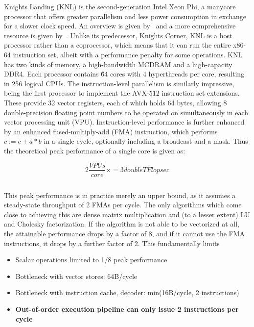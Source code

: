 Knights Landing (KNL) is the second-generation Intel Xeon Phi, a manycore processor that offers greater parallelism and less power consumption in exchange for a slower clock speed. An overview is given by~\cite{Sodani:2016:KLS:2927511.2927563} and a more comprehensive resource is given by~\cite{Jeffers:2016:IXP:3050856}. Unlike its predecessor, Knights Corner, KNL is a host processor rather than a coprocessor, which means that it can run the entire x86-64 instruction set, albeit with a performance penalty for some operations. KNL has two kinds of memory, a high-bandwidth MCDRAM and a high-capacity DDR4. Each processor contains \~64 cores with 4 hyperthreads per core, resulting in 256 logical CPUs. The instruction-level parallelism is similarly impressive, being the first processor to implement the AVX-512 instruction set extensions. These provide 32 vector registers, each of which holds 64 bytes, allowing 8 double-precision floating point numbers to be operated on simultaneously in each vector processing unit (VPU). Instruction-level performance is further enhanced by an enhanced fused-multiply-add (FMA) instruction, which performs $c := c + a*b$ in a single cycle, optionally including a broadcast and a mask. Thus the theoretical peak performance of a single core is given as:

\begin{equation}
  2 \frac{VPUs}{core} \times  = 3 {double TFlop}{sec}
  \label{eq:knl_peak_perf}
\end{equation}

\[\]

This peak performance is in practice merely an upper bound, as it assumes a steady-state throughput of 2 FMAs per cycle. The only algorithms which come close to achieving this are dense matrix multiplication and (to a lesser extent) LU and Cholesky factorization. If the algorithm is not able to be vectorized at all, the attainable performance drops by a factor of 8, and if it cannot use the FMA instructions, it drops by a further factor of 2. This fundamentally limits 

\begin{itemize}
    \item Scalar operations limited to 1/8 peak performance
    \item Bottleneck with vector stores: 64B/cycle
    \item Bottleneck with instruction cache, decoder: min(16B/cycle, 2 instructions)
    \item \textbf{Out-of-order execution pipeline can only issue 2 instructions per cycle}
\end{itemize}

